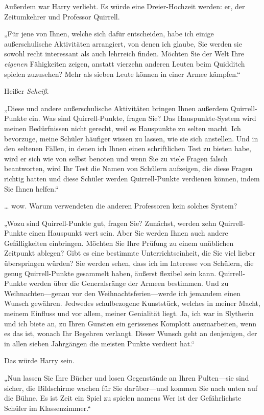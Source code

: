 {Außerdem war Harry verliebt. Es würde eine Dreier-Hochzeit werden: er, der Zeitumkehrer und Professor Quirrell.

„Für jene von Ihnen, welche sich dafür entscheiden, habe ich einige außerschulische Aktivitäten arrangiert, von denen ich glaube, Sie werden sie sowohl recht interessant als auch lehrreich finden. Möchten Sie der Welt Ihre \emph{eigenen} Fähigkeiten zeigen, anstatt vierzehn anderen Leuten beim Quidditch spielen zuzusehen? Mehr als sieben Leute können in einer Armee kämpfen.“

Heißer \emph{Scheiß}.

„Diese und andere außerschulische Aktivitäten bringen Ihnen außerdem Quirrell-Punkte ein. Was sind Quirrell-Punkte, fragen Sie? Das Hauspunkte-System wird meinen Bedürfnissen nicht gerecht, weil es Hauspunkte zu selten macht. Ich bevorzuge, meine Schüler häufiger wissen zu lassen, wie sie sich anstellen. Und in den seltenen Fällen, in denen ich Ihnen einen schriftlichen Test zu bieten habe, wird er sich wie von selbst benoten und wenn Sie zu viele Fragen falsch beantworten, wird Ihr Test die Namen von Schülern aufzeigen, die diese Fragen richtig hatten und diese Schüler werden Quirrell-Punkte verdienen können, indem Sie Ihnen helfen.“

… wow. Warum verwendeten die anderen Professoren kein solches System?

„Wozu sind Quirrell-Punkte gut, fragen Sie? Zunächst, werden zehn Quirrell-Punkte einen Hauspunkt wert sein. Aber Sie werden Ihnen auch andere Gefälligkeiten einbringen. Möchten Sie Ihre Prüfung zu einem unüblichen Zeitpunkt ablegen? Gibt es eine bestimmte Unterrichtseinheit, die Sie viel lieber überspringen würden? Sie werden sehen, dass ich im Interesse von Schülern, die genug Quirrell-Punkte gesammelt haben, äußerst flexibel sein kann. Quirrell-Punkte werden über die Generalsränge der Armeen bestimmen. Und zu Weihnachten—genau vor den Weihnachtsferien—werde ich jemandem einen Wunsch gewähren. Jedwedes schulbezogene Kunststück, welches in meiner Macht, meinem Einfluss und vor allem, meiner Genialität liegt. Ja, ich war in Slytherin und ich biete an, zu Ihren Gunsten ein gerissenes Komplott auszuarbeiten, wenn es das ist, wonach Ihr Begehren verlangt. Dieser Wunsch geht an denjenigen, der in allen sieben Jahrgängen die meisten Punkte verdient hat.“

Das würde Harry sein.

„Nun lassen Sie Ihre Bücher und losen Gegenstände an Ihren Pulten—sie sind sicher, die Bildschirme wachen für Sie darüber—und kommen Sie nach unten auf die Bühne. Es ist Zeit ein Spiel zu spielen namens Wer ist der Gefährlichste Schüler im Klassenzimmer.“

}

